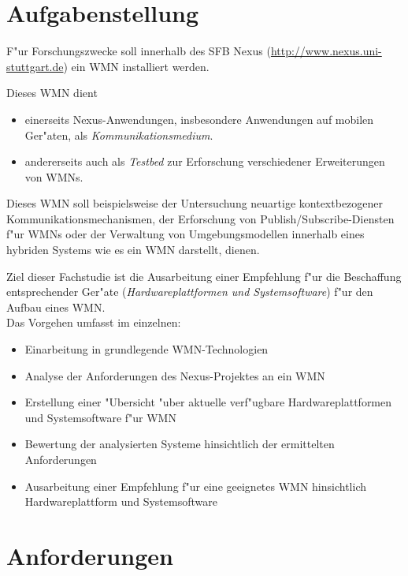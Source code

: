 \section{Aufgabenstellung}

F"ur Forschungszwecke soll innerhalb des SFB Nexus
(\url{http://www.nexus.uni-stuttgart.de}) 
ein WMN installiert werden. 

Dieses WMN dient 
\begin{itemize}
	\item einerseits Nexus-Anwendungen, insbesondere Anwendungen 
	auf mobilen Ger"aten, als \emph{Kommunikationsmedium}. 

	\item andererseits auch als \emph{Testbed} 
	zur Erforschung verschiedener Erweiterungen von WMNs.
\end{itemize}

Dieses WMN soll beispielsweise der Untersuchung neuartige kontextbezogener 
Kommunikationsmechanismen, der Erforschung von 
Publish/Subscribe-Diensten f"ur WMNs oder der 
Verwaltung von Umgebungsmodellen innerhalb eines 
hybriden Systems wie es ein WMN darstellt, dienen.

Ziel dieser Fachstudie ist die Ausarbeitung einer 
Empfehlung f"ur die Beschaffung entsprechender Ger"ate 
(\emph{Hardwareplattformen und Systemsoftware}) f"ur
den Aufbau eines WMN. \\

Das Vorgehen umfasst im einzelnen:

\begin{itemize}
	
	\item Einarbeitung in grundlegende WMN-Technologien
	\item Analyse der Anforderungen des Nexus-Projektes an ein WMN
	\item Erstellung einer "Ubersicht "uber aktuelle verf"ugbare 
	Hardwareplattformen und Systemsoftware f"ur WMN
	\item Bewertung der analysierten Systeme hinsichtlich 
	der ermittelten Anforderungen 	
	\item Ausarbeitung einer Empfehlung f"ur eine geeignetes 
	WMN hinsichtlich Hardwareplattform und Systemsoftware
	
\end{itemize}


\section{Anforderungen}

